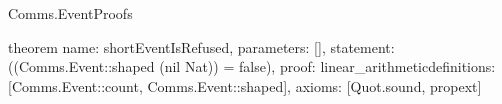 \begin{lexlean}{Comms.EventProofs}
\begin{semanticmodule}
theorem{
  name: shortEventIsRefused,
  parameters: [],
  statement: ((Comms.Event::shaped (nil Nat)) = false),
  proof: linear_arithmetic{definitions: [Comms.Event::count, Comms.Event::shaped]},
  axioms: [Quot.sound, propext]
}
\end{semanticmodule}
\end{lexlean}
